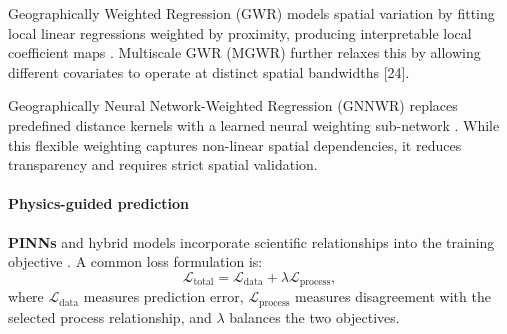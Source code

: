 Geographically Weighted Regression (GWR) models spatial variation by fitting local linear regressions weighted by proximity, producing interpretable local coefficient maps \cite{brunsdon1996Geographically_C6_GWR, wheeler2005Multicollinearity_C6_GWR}. Multiscale GWR (MGWR) further relaxes this by allowing different covariates to operate at distinct spatial bandwidths [24].

Geographically Neural Network-Weighted Regression (GNNWR) replaces predefined distance kernels with a learned neural weighting sub-network \cite{du2020Geographically_C6_GWR}. While this flexible weighting captures non-linear spatial dependencies, it reduces transparency and requires strict spatial validation. 

\paragraph*{Physics-guided prediction}
\textbf{PINNs} and hybrid models incorporate scientific relationships into the training objective \cite{karpatne2017Theory_C4_NN, raissi2019Physics_C4_NN, karniadakis2021Physics_C4_NN, willard2022Integrating_C4_NN}. A common loss formulation is:
\begin{equation}
\mathcal{L}_{\text{total}} = \mathcal{L}_{\text{data}} + \lambda\mathcal{L}_{\text{process}},
\label{eq:pinn-loss-general}
\end{equation}
where $\mathcal{L}_{\text{data}}$ measures prediction error, $\mathcal{L}_{\text{process}}$ measures disagreement with the selected process relationship, and $\lambda$ balances the two objectives.

